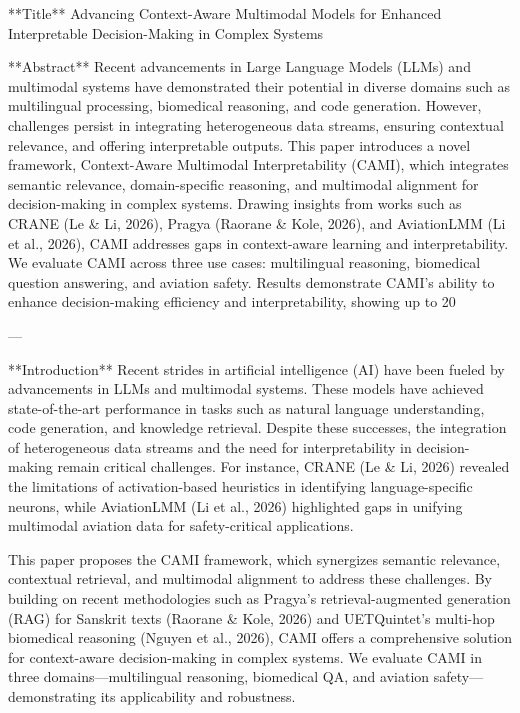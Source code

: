 **Title**  
Advancing Context-Aware Multimodal Models for Enhanced Interpretable Decision-Making in Complex Systems  

**Abstract**  
Recent advancements in Large Language Models (LLMs) and multimodal systems have demonstrated their potential in diverse domains such as multilingual processing, biomedical reasoning, and code generation. However, challenges persist in integrating heterogeneous data streams, ensuring contextual relevance, and offering interpretable outputs. This paper introduces a novel framework, Context-Aware Multimodal Interpretability (CAMI), which integrates semantic relevance, domain-specific reasoning, and multimodal alignment for decision-making in complex systems. Drawing insights from works such as CRANE (Le & Li, 2026), Pragya (Raorane & Kole, 2026), and AviationLMM (Li et al., 2026), CAMI addresses gaps in context-aware learning and interpretability. We evaluate CAMI across three use cases: multilingual reasoning, biomedical question answering, and aviation safety. Results demonstrate CAMI's ability to enhance decision-making efficiency and interpretability, showing up to 20%

---

**Introduction**  
Recent strides in artificial intelligence (AI) have been fueled by advancements in LLMs and multimodal systems. These models have achieved state-of-the-art performance in tasks such as natural language understanding, code generation, and knowledge retrieval. Despite these successes, the integration of heterogeneous data streams and the need for interpretability in decision-making remain critical challenges. For instance, CRANE (Le & Li, 2026) revealed the limitations of activation-based heuristics in identifying language-specific neurons, while AviationLMM (Li et al., 2026) highlighted gaps in unifying multimodal aviation data for safety-critical applications.

This paper proposes the CAMI framework, which synergizes semantic relevance, contextual retrieval, and multimodal alignment to address these challenges. By building on recent methodologies such as Pragya's retrieval-augmented generation (RAG) for Sanskrit texts (Raorane & Kole, 2026) and UETQuintet's multi-hop biomedical reasoning (Nguyen et al., 2026), CAMI offers a comprehensive solution for context-aware decision-making in complex systems. We evaluate CAMI in three domains—multilingual reasoning, biomedical QA, and aviation safety—demonstrating its applicability and robustness.


